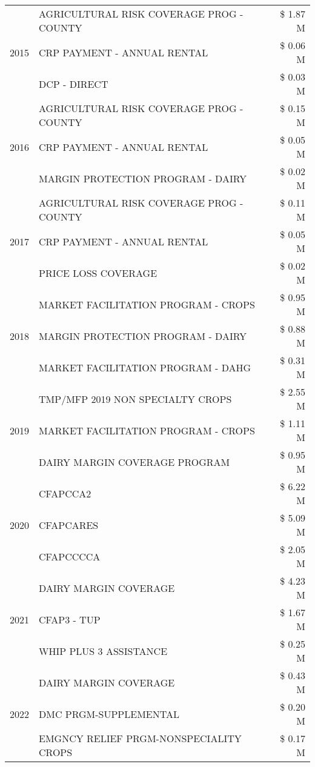 \begin{tabular}{llr}
\multirow[t]{3}{*}{2015} & AGRICULTURAL RISK COVERAGE PROG - COUNTY & \$ 1.87 M \\
 & CRP PAYMENT - ANNUAL RENTAL & \$ 0.06 M \\
 & DCP - DIRECT & \$ 0.03 M \\
\cline{1-3}
\multirow[t]{3}{*}{2016} & AGRICULTURAL RISK COVERAGE PROG - COUNTY & \$ 0.15 M \\
 & CRP PAYMENT - ANNUAL RENTAL & \$ 0.05 M \\
 & MARGIN PROTECTION PROGRAM - DAIRY & \$ 0.02 M \\
\cline{1-3}
\multirow[t]{3}{*}{2017} & AGRICULTURAL RISK COVERAGE PROG - COUNTY & \$ 0.11 M \\
 & CRP PAYMENT - ANNUAL RENTAL & \$ 0.05 M \\
 & PRICE LOSS COVERAGE & \$ 0.02 M \\
\cline{1-3}
\multirow[t]{3}{*}{2018} & MARKET FACILITATION PROGRAM - CROPS & \$ 0.95 M \\
 & MARGIN PROTECTION PROGRAM - DAIRY & \$ 0.88 M \\
 & MARKET FACILITATION PROGRAM - DAHG & \$ 0.31 M \\
\cline{1-3}
\multirow[t]{3}{*}{2019} & TMP/MFP 2019 NON SPECIALTY CROPS & \$ 2.55 M \\
 & MARKET FACILITATION PROGRAM - CROPS & \$ 1.11 M \\
 & DAIRY MARGIN COVERAGE PROGRAM & \$ 0.95 M \\
\cline{1-3}
\multirow[t]{3}{*}{2020} & CFAPCCA2 & \$ 6.22 M \\
 & CFAPCARES & \$ 5.09 M \\
 & CFAPCCCCA & \$ 2.05 M \\
\cline{1-3}
\multirow[t]{3}{*}{2021} & DAIRY MARGIN COVERAGE & \$ 4.23 M \\
 & CFAP3 - TUP & \$ 1.67 M \\
 & WHIP PLUS 3 ASSISTANCE & \$ 0.25 M \\
\cline{1-3}
\multirow[t]{3}{*}{2022} & DAIRY MARGIN COVERAGE & \$ 0.43 M \\
 & DMC PRGM-SUPPLEMENTAL & \$ 0.20 M \\
 & EMGNCY RELIEF PRGM-NONSPECIALITY CROPS & \$ 0.17 M \\
\cline{1-3}
\bottomrule
\end{tabular}
